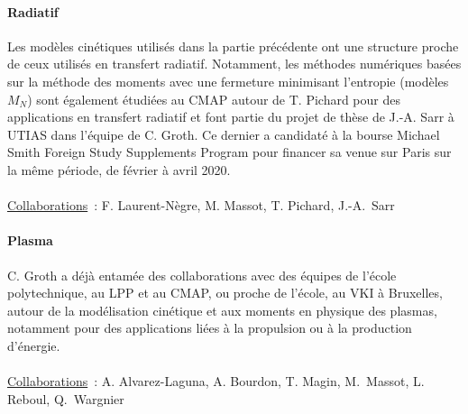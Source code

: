 \documentclass[12pt]{article}
\begin{document}
\paragraph{Radiatif \\ }
Les modèles cinétiques utilisés dans la partie précédente ont une structure proche de ceux utilisés en transfert radiatif. Notamment, les méthodes numériques basées sur la méthode des moments avec une fermeture minimisant l'entropie (modèles $M_N$) sont également étudiées au CMAP autour de T. Pichard pour des applications en transfert radiatif et font partie du projet de thèse de J.-A. Sarr à UTIAS dans l'équipe de C. Groth. Ce dernier a candidaté à la bourse \og{}Michael Smith Foreign Study Supplements Program\fg{} pour financer sa venue sur Paris sur la même période, de février à avril 2020.  \\ \\
%
\underline{Collaborations}~: F. Laurent-Nègre, M. Massot, T. Pichard, J.-A.~Sarr

\paragraph{Plasma \\ }
C. Groth a déjà entamée des collaborations avec des équipes de l'école polytechnique, au LPP et au CMAP, ou proche de l'école, au VKI à Bruxelles, autour de la modélisation cinétique et aux moments en physique des plasmas, notamment pour des applications liées à la propulsion ou à la production d'énergie. \\ \\
%
\underline{Collaborations}~: A. Alvarez-Laguna, A. Bourdon, T. Magin, M.~Massot, L. Reboul, Q.~Wargnier
\end{document}
